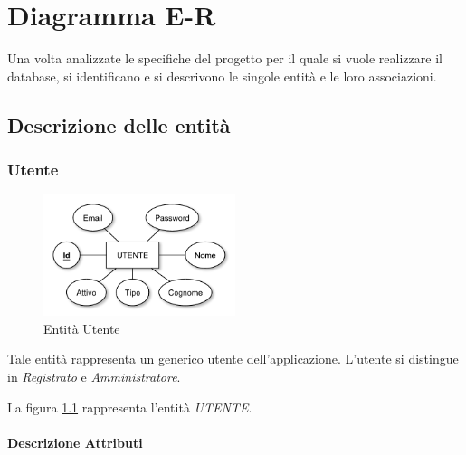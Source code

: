 
\chapter{Diagramma E-R}
\label{cap:diagramma}

Una volta analizzate le specifiche del progetto per il quale si vuole realizzare il database, si identificano e si descrivono le singole entità e le loro associazioni.

\section{Descrizione delle entità}
	
	\subsection{Utente}
	
		\begin{figure}[h]
			\centering
			\includegraphics[width=0.5\textwidth]
			{immagini/01-utente}
			
			\caption{Entità Utente}
			\label{entita-utente}
		\end{figure}
		
		Tale entità rappresenta un generico utente dell'applicazione. L'utente si distingue in \emph{Registrato} e \emph{Amministratore}.
		
		La figura \ref{entita-utente} rappresenta l'entità \emph{UTENTE}.
		
		\subsubsection*{Descrizione Attributi}
		
